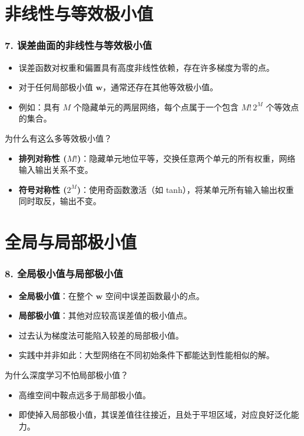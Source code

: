 \documentclass[t,aspectratio=169]{beamer} %
\begin{document}
\section{非线性与等效极小值}

\begin{frame}
    \frametitle{7. 误差曲面的非线性与等效极小值}
    \begin{itemize}
        \item 误差函数对权重和偏置具有\alert{高度非线性}依赖，存在许多梯度为零的点。
        \item 对于任何局部极小值 $\mathbf{w}$，通常还存在其他\alert{等效极小值}。
        \item 例如：具有 $M$ 个隐藏单元的两层网络，每个点属于一个包含 $M!\,2^M$ 个等效点的集合。
    \end{itemize}
    \begin{block}{为什么有这么多等效极小值？}
        \begin{itemize}
            \item \textbf{排列对称性 ($M!$)}：隐藏单元地位平等，交换任意两个单元的所有权重，网络输入输出关系不变。
            \item \textbf{符号对称性 ($2^M$)}：使用奇函数激活（如 tanh），将某单元所有输入输出权重同时取反，输出不变。
        \end{itemize}
    \end{block}
\end{frame}

\section{全局与局部极小值}

\begin{frame}
    \frametitle{8. 全局极小值与局部极小值}
    \begin{itemize}
        \item \textbf{全局极小值}：在整个 $\mathbf{w}$ 空间中误差函数最小的点。
        \item \textbf{局部极小值}：其他对应较高误差值的极小值点。
        \item 过去认为梯度法可能陷入较差的局部极小值。
        \item \alert{实践中并非如此}：大型网络在不同初始条件下都能达到性能相似的解。
    \end{itemize}
    \begin{block}{为什么深度学习不怕局部极小值？}
        \begin{itemize}
            \item 高维空间中\alert{鞍点远多于局部极小值}。
            \item 即使掉入局部极小值，其误差值往往接近，且处于\alert{平坦区域}，对应良好泛化能力。
        \end{itemize}
    \end{block}
\end{frame}
\end{document}
